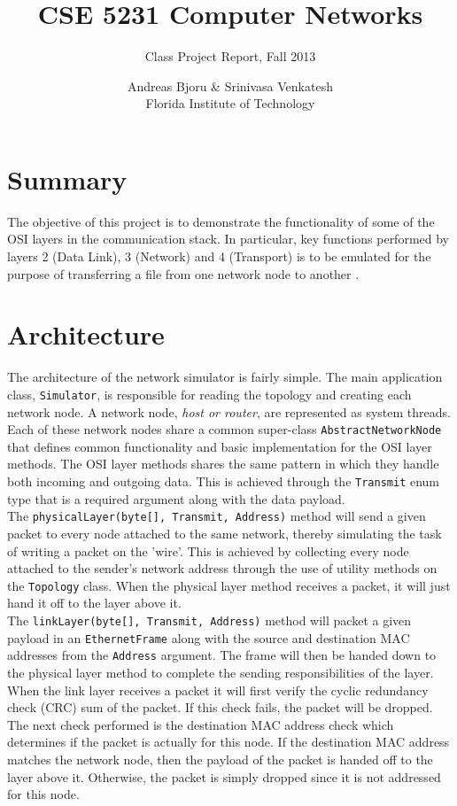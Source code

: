 \documentclass{scrartcl}
\begin{document}
\author{Andreas Bjoru \& Srinivasa Venkatesh\\ Florida Institute of Technology}
\title{CSE 5231 Computer Networks}
\subtitle{Class Project Report, Fall 2013}
\renewcommand{\today}{November 26, 2013}
\maketitle
\tableofcontents
\newpage

\section{Summary}
The objective of this project is to demonstrate the functionality of some of the OSI layers in the communication stack. In particular, key functions performed by layers 2 (Data Link), 3 (Network) and 4 (Transport) is to be emulated for the purpose of transferring a file from one network node to another \cite{assignment}. 

\section{Architecture}
The architecture of the network simulator is fairly simple. The main application class, \texttt{Simulator}, is responsible for reading the topology and creating each network node. A network node, \textit{host or router}, are represented as system threads. Each of these network nodes share a common super-class \texttt{AbstractNetworkNode} that defines common functionality and basic implementation for the OSI layer methods. The OSI layer methods shares the same pattern in which they handle both incoming and outgoing data. This is achieved through the \texttt{Transmit} enum type that is a required argument along with the data payload. \\

The \texttt{physicalLayer(byte[], Transmit, Address)} method will send a given packet to every node attached to the same network, thereby simulating the task of writing a packet on the 'wire'. This is achieved by collecting every node attached to the sender's network address through the use of utility methods on the \texttt{Topology} class. When the physical layer method receives a packet, it will just hand it off to the layer above it.\\

The \texttt{linkLayer(byte[], Transmit, Address)} method will packet a given payload in an \texttt{EthernetFrame} along with the source and destination MAC addresses from the \texttt{Address} argument. The frame will then be handed down to the physical layer method to complete the sending responsibilities of the layer. When the link layer receives a packet it will first verify the cyclic redundancy check (CRC) sum of the packet. If this check fails, the packet will be dropped. The next check performed is the destination MAC address check which determines if the packet is actually for this node. If the destination MAC address matches the network node, then the payload of the packet is handed off to the layer above it. Otherwise, the packet is simply dropped since it is not addressed for this node.
\end{document}
